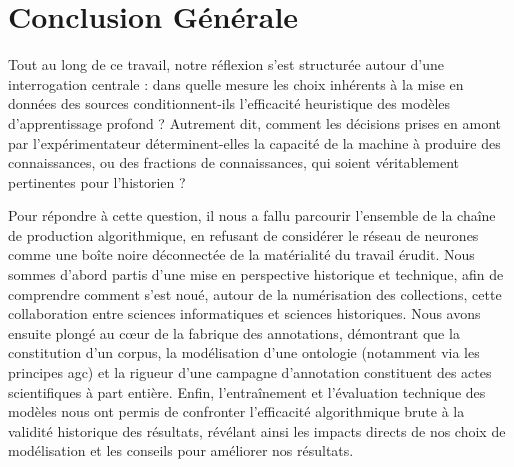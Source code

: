 \chapter{Conclusion Générale}


Tout au long de ce travail, notre réflexion s'est structurée autour d'une interrogation centrale : dans quelle mesure les choix inhérents à la \og mise en données \fg{} des sources conditionnent-ils l'efficacité heuristique des modèles d'apprentissage profond ? Autrement dit, comment les décisions prises en amont par l'expérimentateur déterminent-elles la capacité de la machine à produire des connaissances, ou des fractions de connaissances, qui soient véritablement pertinentes pour l'historien ?

Pour répondre à cette question, il nous a fallu parcourir l'ensemble de la chaîne de production algorithmique, en refusant de considérer le réseau de neurones comme une \og boîte noire \fg{} déconnectée de la matérialité du travail érudit. Nous sommes d'abord partis d'une mise en perspective historique et technique, afin de comprendre comment s'est noué, autour de la numérisation des collections, cette collaboration entre sciences informatiques et sciences historiques. Nous avons ensuite plongé au cœur de la fabrique des annotations, démontrant que la constitution d'un corpus, la modélisation d'une ontologie (notamment via les principes \gls{agc}) et la rigueur d'une campagne d'annotation constituent des actes scientifiques à part entière. Enfin, l'entraînement et l'évaluation technique des modèles nous ont permis de confronter l'efficacité algorithmique brute à la validité historique des résultats, révélant ainsi les impacts directs de nos choix de modélisation et les conseils pour améliorer nos résultats. 


